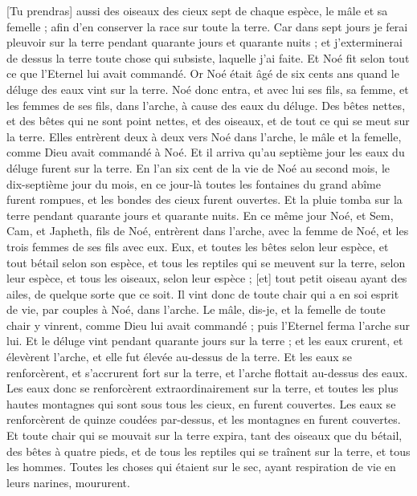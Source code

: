 \begin{multicols}{2}
[Tu prendras] aussi des oiseaux des cieux sept de chaque espèce, le mâle et sa femelle ; afin d'en conserver la race sur toute la terre.
Car dans sept jours je ferai pleuvoir sur la terre pendant quarante jours et quarante nuits ; et j'exterminerai de dessus la terre toute chose qui subsiste, laquelle j'ai faite.
Et Noé fit selon tout ce que l'Eternel lui avait commandé.
Or Noé était âgé de six cents ans quand le déluge des eaux vint sur la terre.
Noé donc entra, et avec lui ses fils, sa femme, et les femmes de ses fils, dans l'arche, à cause des eaux du déluge.
Des bêtes nettes, et des bêtes qui ne sont point nettes, et des oiseaux, et de tout ce qui se meut sur la terre.
Elles entrèrent deux à deux vers Noé dans l'arche, le mâle et la femelle, comme Dieu avait commandé à Noé.
Et il arriva qu'au septième jour les eaux du déluge furent sur la terre.
En l'an six cent de la vie de Noé au second mois, le dix-septième jour du mois, en ce jour-là toutes les fontaines du grand abîme furent rompues, et les bondes des cieux furent ouvertes.
Et la pluie tomba sur la terre pendant quarante jours et quarante nuits.
En ce même jour Noé, et Sem, Cam, et Japheth, fils de Noé, entrèrent dans l'arche, avec la femme de Noé, et les trois femmes de ses fils avec eux.
Eux, et toutes les bêtes selon leur espèce, et tout bétail selon son espèce, et tous les reptiles qui se meuvent sur la terre, selon leur espèce, et tous les oiseaux, selon leur espèce ; [et] tout petit oiseau ayant des ailes, de quelque sorte que ce soit.
Il vint donc de toute chair qui a en soi esprit de vie, par couples à Noé, dans l'arche.
Le mâle, dis-je, et la femelle de toute chair y vinrent, comme Dieu lui avait commandé ; puis l'Eternel ferma l'arche sur lui.
Et le déluge vint pendant quarante jours sur la terre ; et les eaux crurent, et élevèrent l'arche, et elle fut élevée au-dessus de la terre.
Et les eaux se renforcèrent, et s'accrurent fort sur la terre, et l'arche flottait au-dessus des eaux.
Les eaux donc se renforcèrent extraordinairement sur la terre, et toutes les plus hautes montagnes qui sont sous tous les cieux, en furent couvertes.
Les eaux se renforcèrent de quinze coudées par-dessus, et les montagnes en furent couvertes.
Et toute chair qui se mouvait sur la terre expira, tant des oiseaux que du bétail, des bêtes à quatre pieds, et de tous les reptiles qui se traînent sur la terre, et tous les hommes.
Toutes les choses qui étaient sur le sec, ayant respiration de vie en leurs narines, moururent.

\end{multicols}
